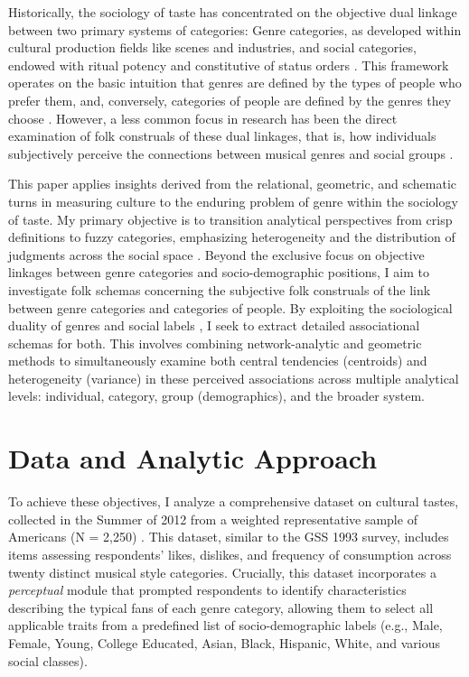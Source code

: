 \documentclass[12pt]{article}
\begin{document}
Historically, the sociology of taste has concentrated on the objective dual linkage between two primary systems of categories: Genre categories, as developed within cultural production fields like scenes and industries, and social categories, endowed with ritual potency and constitutive of status orders \citep{bourdieu1984distinction-835, bourdieu1993field-8ad, dimaggio1987classification-758, lena2012banding-4b5}. This framework operates on the basic intuition that genres are defined by the types of people who prefer them, and, conversely, categories of people are defined by the genres they choose \citep{breiger2000tool-db3, lizardo2016cultural-aaa}. However, a less common focus in research has been the direct examination of folk construals of these dual linkages, that is, how individuals subjectively perceive the connections between musical genres and social groups \citep{lizardo2016cultural-aaa}.

This paper applies insights derived from the relational, geometric, and schematic turns in measuring culture \citep{goldberg2011mapping-77a, rouanet2000geometric-a44} to the enduring problem of genre within the sociology of taste. My primary objective is to transition analytical perspectives from crisp definitions to fuzzy categories, emphasizing heterogeneity and the distribution of judgments across the social space \citep{romney1986culture-aaa}. Beyond the exclusive focus on objective linkages between genre categories and socio-demographic positions, I aim to investigate folk schemas concerning the subjective folk construals of the link between genre categories and categories of people. By exploiting the sociological duality of genres and social labels \citep{basov2017duality-24b, breiger1974duality-1d0}, I seek to extract detailed associational schemas for both. This involves combining network-analytic and geometric methods to simultaneously examine both central tendencies (centroids) and heterogeneity (variance) in these perceived associations across multiple analytical levels: individual, category, group (demographics), and the broader system.

\section*{Data and Analytic Approach}
To achieve these objectives, I analyze a comprehensive dataset on cultural tastes, collected in the Summer of 2012 from a weighted representative sample of Americans (N = 2,250) \citep{lizardo2016cultural-aaa, lizardo2015musical-8c6, lizardo2024from-ddd}. This dataset, similar to the GSS 1993 survey, includes items assessing respondents' likes, dislikes, and frequency of consumption across twenty distinct musical style categories. Crucially, this dataset incorporates a \textit{perceptual} module that prompted respondents to identify characteristics describing the typical fans of each genre category, allowing them to select all applicable traits from a predefined list of socio-demographic labels (e.g., Male, Female, Young, College Educated, Asian, Black, Hispanic, White, and various social classes). 
\end{document}
